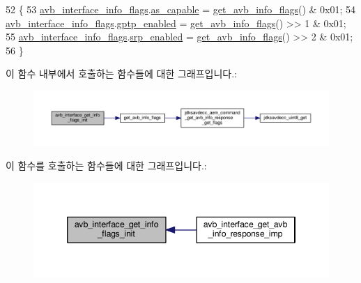 \begin{DoxyCode}
52 \{
53     \hyperlink{classavdecc__lib_1_1avb__interface__get__avb__info__response__imp_ab77eb13b908565111755a1a70652fb54}{avb\_interface\_info\_flags}.\hyperlink{structavdecc__lib_1_1avb__interface__get__avb__info__response__imp_1_1avb__interface__get__avb__info__flags_a841ecf02ad6c925cf339a78c176e83cd}{as\_capable} = 
      \hyperlink{classavdecc__lib_1_1avb__interface__get__avb__info__response__imp_a9462f9211613dbb51e4741a0b7174489}{get\_avb\_info\_flags}() & 0x01;
54     \hyperlink{classavdecc__lib_1_1avb__interface__get__avb__info__response__imp_ab77eb13b908565111755a1a70652fb54}{avb\_interface\_info\_flags}.\hyperlink{structavdecc__lib_1_1avb__interface__get__avb__info__response__imp_1_1avb__interface__get__avb__info__flags_a01986b6f39f06dd3834c80df38992489}{gptp\_enabled} = 
      \hyperlink{classavdecc__lib_1_1avb__interface__get__avb__info__response__imp_a9462f9211613dbb51e4741a0b7174489}{get\_avb\_info\_flags}() >> 1 & 0x01;
55     \hyperlink{classavdecc__lib_1_1avb__interface__get__avb__info__response__imp_ab77eb13b908565111755a1a70652fb54}{avb\_interface\_info\_flags}.\hyperlink{structavdecc__lib_1_1avb__interface__get__avb__info__response__imp_1_1avb__interface__get__avb__info__flags_af400e9eca233fc22a73a4b5624f6a5e8}{srp\_enabled} = 
      \hyperlink{classavdecc__lib_1_1avb__interface__get__avb__info__response__imp_a9462f9211613dbb51e4741a0b7174489}{get\_avb\_info\_flags}() >> 2 & 0x01;
56 \}
\end{DoxyCode}


이 함수 내부에서 호출하는 함수들에 대한 그래프입니다.\+:
\nopagebreak
\begin{figure}[H]
\begin{center}
\leavevmode
\includegraphics[width=350pt]{classavdecc__lib_1_1avb__interface__get__avb__info__response__imp_a8600b3a2714224aff1e64f1f2949a202_cgraph}
\end{center}
\end{figure}




이 함수를 호출하는 함수들에 대한 그래프입니다.\+:
\nopagebreak
\begin{figure}[H]
\begin{center}
\leavevmode
\includegraphics[width=346pt]{classavdecc__lib_1_1avb__interface__get__avb__info__response__imp_a8600b3a2714224aff1e64f1f2949a202_icgraph}
\end{center}
\end{figure}


